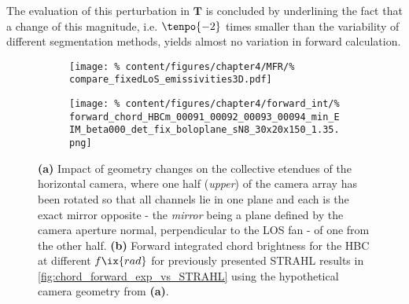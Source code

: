             The evaluation of this perturbation in $\mathbf{T}$ is concluded by underlining the fact that a change of this magnitude, i.e. $\tenpo{-2}$ times smaller than the variability of different segmentation methods, yields almost no variation in forward calculation.%
%
            \begin{figure}[t]%
                \centering%
                \begin{subfigure}{0.47\textwidth}%
                    \texttt{[image: \%
                        content/figures/chapter4/MFR/\%
                        compare\_fixedLoS\_emissivities3D.pdf]}%
                    \caption{}%
                \end{subfigure}%
                \hfill%
                \begin{subfigure}{0.47\textwidth}%
                    \texttt{[image: \%
                        content/figures/chapter4/forward\_int/\%
                        forward\_chord\_HBCm\_00091\_00092\_00093\_00094\_min\_EIM\_beta000\_det\_fix\_boloplane\_sN8\_30x20x150\_1.35.png]}%
                    \caption{}%
                \end{subfigure}%
                \caption{\textbf{(a)} Impact of geometry changes on the collective etendues of the horizontal camera, where one half (\textit{upper}) of the camera array has been rotated so that all channels lie in one plane and each is the exact mirror opposite - the \textit{mirror} being a plane defined by the camera aperture normal, perpendicular to the LOS fan - of one from the other half. \textbf{(b)} Forward integrated chord brightness for the HBC at different $f\ix{rad}$ for previously presented STRAHL results in \cref{fig:chord_forward_exp_vs_STRAHL} using the hypothetical camera geometry from \textbf{(a)}.}\label{fig:geometry_forward_fixed}%
            \end{figure}%
%
